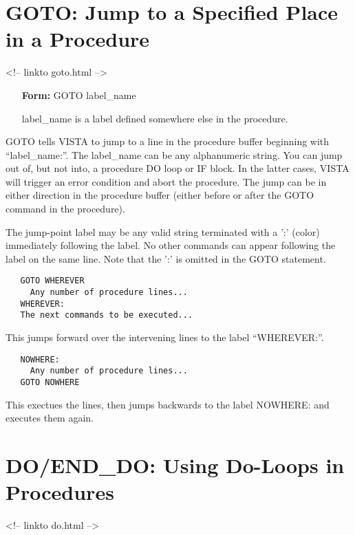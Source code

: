 \section{GOTO: Jump to a Specified Place in a Procedure}
\begin{rawhtml}
<!-- linkto goto.html -->
\end{rawhtml}

\begin{itemize}
  \item[\textbf{Form: } GOTO label\_name\hfill]{}
  \item[label\_name]{is a label defined somewhere else in the procedure.}
\end{itemize}
GOTO tells VISTA to jump to a line in the procedure buffer beginning with
``label\_name:''.  The label\_name can be any alphanumeric string.  You can
jump out of, but not into, a procedure DO loop or IF block.  In the latter
cases, VISTA will trigger an error condition and abort the procedure.  The
jump can be in either direction in the procedure buffer (either before or
after the GOTO command in the procedure).

The jump-point label may be any valid string terminated with a ':' (color)
immediately following the label.  No other commands can appear following
the label on the same line.  Note that the ':' is omitted in the GOTO
statement.

\begin{verbatim}
   GOTO WHEREVER
     Any number of procedure lines...
   WHEREVER:
   The next commands to be executed...
\end{verbatim}
This jumps forward over the intervening lines to the label ``WHEREVER:''.

\begin{verbatim}
   NOWHERE:
     Any number of procedure lines...
   GOTO NOWHERE
\end{verbatim}
This exectues the lines, then jumps backwards to the label NOWHERE: and
executes them again.

\section{DO/END\_DO: Using Do-Loops in Procedures}
\begin{rawhtml}
<!-- linkto do.html -->
\end{rawhtml}

